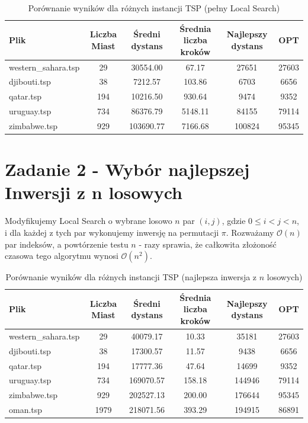 \documentclass{article}
\begin{document}
\begin{table}[H]
    \centering
    \caption{Porównanie wyników dla różnych instancji TSP (pełny Local Search)}
    \begin{tabular}{lccccc}
        \toprule
        Plik & Liczba Miast & Średni dystans & Średnia liczba kroków & Najlepszy dystans & OPT \\
        \midrule
        western\_sahara.tsp & 29  & 30554.00 & 67.17 & 27651     & 27603 \\
        djibouti.tsp        & 38  & 7212.57  & 103.86 & 6703     & 6656 \\
        qatar.tsp           & 194 & 10216.50 & 930.64 & 9474     & 9352 \\
        uruguay.tsp         & 734 & 86376.79 & 5148.11 & 84155   & 79114 \\
        zimbabwe.tsp        & 929 & 103690.77 & 7166.68 & 100824 & 95345 \\
        \bottomrule
    \end{tabular}
\end{table}

\section{Zadanie 2 - Wybór najlepszej Inwersji z n losowych}

Modyfikujemy Local Search o wybrane losowo $n$ par $(i,j)$, gdzie $0 \leq i < j < n$, i dla każdej z tych par wykonujemy inwersję na permutacji $\pi$.
Rozważamy $\mathcal{O}(n)$ par indeksów, a powtórzenie testu $n$ - razy sprawia, że całkowita złożoność czasowa tego algorytmu wynosi $\mathcal{O}(n^2)$.

\begin{table}[H]
    \centering
    \caption{Porównanie wyników dla różnych instancji TSP (najlepsza inwersja z $n$ losowych)}
    \begin{tabular}{lccccc}
        \toprule
        Plik & Liczba Miast & Średni dystans & Średnia liczba kroków & Najlepszy dystans & OPT \\
        \midrule
        western\_sahara.tsp & 29 & 40079.17 & 10.33 & 35181     & 27603 \\
        djibouti.tsp        & 38 & 17300.57 & 11.57 & 9438      & 6656 \\
        qatar.tsp           & 194 & 17777.36 & 47.64 & 14699    & 9352 \\
        uruguay.tsp         & 734 & 169070.57 & 158.18 & 144946 & 79114 \\
        zimbabwe.tsp        & 929 & 202527.13 & 200.00 & 176644 & 95345 \\
        oman.tsp            & 1979 & 218071.56 & 393.29 & 194915 & 86891 \\
        \bottomrule
    \end{tabular}
\end{table}
\end{document}

